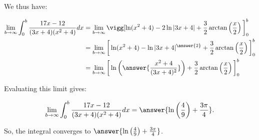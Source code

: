 \documentclass{ximera}
\begin{document}
\begin{exercise}
\begin{exercise}
\begin{exercise}
\begin{exercise}
We thus have:

\begin{align*}
\lim_{b\rightarrow \infty} \int_{0}^{b} \frac{17x-12}{(3x+4)(x^2+4)} dx &= \lim_{b\rightarrow \infty} \vigg[\ln(x^2+4)-2 \ln|3x+4|+\frac{3}{2} \arctan\left(\frac{x}{2}\right)\bigg]_0^b  \\
&= \lim_{b\rightarrow \infty} \bigg[\ln(x^2+4)- \ln|3x+4|^{\answer{2}}+\frac{3}{2} \arctan\left(\frac{x}{2}\right)\bigg]_0^b \\
&= \lim_{b\rightarrow \infty} \bigg[\ln\left(\answer{\frac{x^2+4}{(3x+4)^2}}\right)+\frac{3}{2} \arctan\left(\frac{x}{2}\right)\bigg]_0^b
\end{align*}

Evaluating this limit gives:

\[ \lim_{b\rightarrow \infty} \int_{0}^{b} \frac{17x-12}{(3x+4)(x^2+4)} dx  = \answer{\ln\left(\frac{4}{9}\right) + \frac{3 \pi}{4}  }.
\]

So, the integral converges to $\answer{\ln\left(\frac{4}{9}\right) + \frac{3 \pi}{4}  }$.
\end{exercise}
\end{exercise}
\end{exercise}









\end{exercise}
\end{document}
